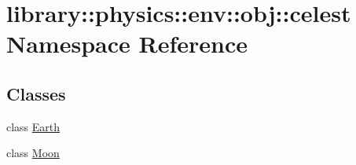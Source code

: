 \hypertarget{namespacelibrary_1_1physics_1_1env_1_1obj_1_1celest}{}\section{library\+:\+:physics\+:\+:env\+:\+:obj\+:\+:celest Namespace Reference}
\label{namespacelibrary_1_1physics_1_1env_1_1obj_1_1celest}
\subsection*{Classes}
\begin{DoxyCompactItemize}
\item 
class \hyperlink{classlibrary_1_1physics_1_1env_1_1obj_1_1celest_1_1_earth}{Earth}
\item 
class \hyperlink{classlibrary_1_1physics_1_1env_1_1obj_1_1celest_1_1_moon}{Moon}
\end{DoxyCompactItemize}
